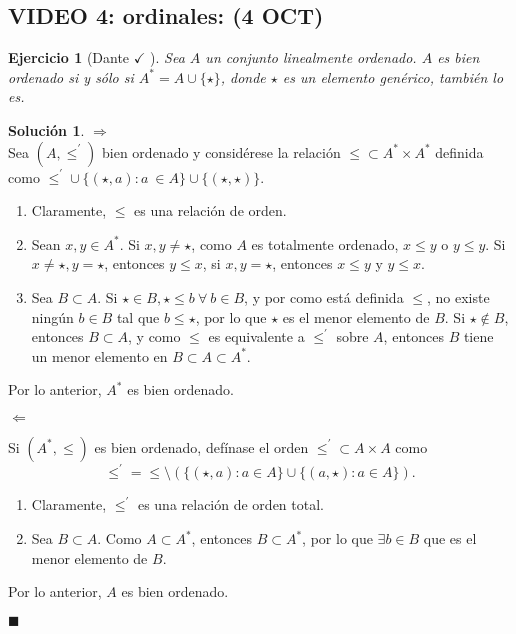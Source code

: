 \documentclass[12pt,letterpaper,titlepage]{article}
\newtheorem{exe}{Ejercicio}
\theoremstyle{definition}
\newtheorem*{sol}{Solución}
\newcommand\<{\langle}
\renewcommand\>{\rangle}
\begin{document}
\subsection{VIDEO 4: ordinales: (4 OCT)}
\begin{exe}[Dante $\checkmark$ ]
  Sea $A$ un conjunto linealmente ordenado. $A$ es bien ordenado si y sólo si $A^{*}=A\cup \{\star\}$, donde $\star$ es un elemento genérico, también lo es.
\end{exe}
\begin{sol}
    $\Rightarrow$\\
    Sea $(A,\leq^{\prime})$ bien ordenado y considérese la relación $\leq\subset A^*\times A^*$ definida como $\leq^{\prime} \cup \{(\star,a):a \ \in A\}\cup \{(\star,\star)\}$. 
    \begin{enumerate}
        \item Claramente, $\leq$ es una relación de orden.
        \item Sean $x,y\in A^*$. Si $x,y \neq \star$, como $A$ es totalmente ordenado, $x\leq y$ o $y\leq y$. Si $x\neq \star, y=\star$, entonces $y\leq x$,  si $x,y=\star$, entonces $x\leq y $ y $y\leq x$.
        \item Sea $B\subset A$. Si $\star\in B, \star\leq b \ \forall \ b\in B$, y por como está definida $\leq$, no existe ningún $b\in B$ tal que $b\leq \star$, por lo que $\star$ es el menor elemento de $B$.
        Si $\star\not\in B$, entonces $B\subset A$, y como $\leq$ es equivalente a $\leq^{\prime}$ sobre $A$, entonces $B$ tiene un menor elemento en $B\subset A \subset A^*$.
    \end{enumerate}
    Por lo anterior, $A^*$ es bien ordenado.\vspace{3mm}
    
    $\Leftarrow$\vspace{3mm}
    
    Si $(A^*,\leq)$ es bien ordenado, defínase el orden $\leq^{\prime}\subset A\times A$ como
    \[
        \leq^{\prime}=\leq\setminus \left( \{(\star,a):a\in A\} \cup \{(a,\star):a\in A\}\right)
    .\]
    \begin{enumerate}
        \item Claramente, $\leq^{\prime} $ es una relación de orden total.
        \item Sea $B\subset A$. Como $A\subset A^*$, entonces $B\subset A^*$, por lo que $\exists b\in B$ que es el menor elemento de $B$.
    \end{enumerate}
    Por lo anterior, $A$ es bien ordenado.\vspace{3mm}
    
    \hfill $\blacksquare$
\end{sol}\vspace{3mm}
\end{document}
